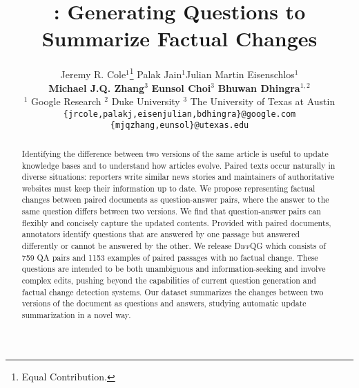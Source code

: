 \documentclass[11pt]{article}
\title{\dataset{}: Generating Questions to Summarize Factual Changes}%
\author{Jeremy R. Cole$^1$\thanks{\enskip Equal Contribution.} \qquad Palak Jain$^1$\footnotemark[1] \qquad Julian Martin Eisenschlos$^1$ \\ \qquad \textbf{Michael J.Q. Zhang}$^3$ \qquad \textbf{Eunsol Choi}$^{3}$ \qquad \textbf{Bhuwan Dhingra}$^{1,2}$ \\
$^1$ Google Research  \qquad  $^2$ Duke University  \qquad $^3$ The University of Texas at Austin \\
\texttt{\{jrcole,palakj,eisenjulian,bdhingra\}@google.com} \\ \texttt{\{mjqzhang,eunsol\}@utexas.edu}}
\newcommand{\dataset}{\textsc{DiffQG}}
\begin{document}
\maketitle
\begin{abstract}
Identifying the difference between two versions of the same article is useful to update knowledge bases and to understand how articles evolve. 
Paired texts occur naturally in diverse situations: reporters write similar news stories and maintainers of authoritative websites must keep their information up to date. 
We propose representing factual changes between paired documents as question-answer pairs, where the answer to the same question differs between two versions. We find that question-answer pairs can flexibly and concisely capture the updated contents. Provided with paired documents, annotators identify questions that are answered by one passage but answered differently or cannot be answered by the other. We release \dataset{} which consists of 759 QA pairs and 1153 examples of paired passages with no factual change. These questions are intended to be both unambiguous and information-seeking and involve complex edits, pushing beyond the capabilities of current question generation and factual change detection systems. Our dataset summarizes the changes between two versions of the document as questions and answers, studying automatic update summarization in a novel way. %



\end{abstract}
\end{document}
